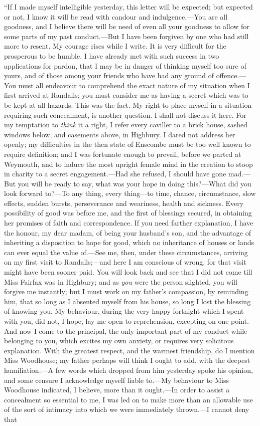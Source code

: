 “If I made myself intelligible yesterday, this letter will be expected; but expected or not, I know it will be read with candour and indulgence.---You are all goodness, and I believe there will be need of even all your goodness to allow for some parts of my past conduct.---But I have been forgiven by one who had still more to resent. My courage rises while I write. It is very difficult for the prosperous to be humble. I have already met with such success in two applications for pardon, that I may be in danger of thinking myself too sure of yours, and of those among your friends who have had any ground of offence.---You must all endeavour to comprehend the exact nature of my situation when I first arrived at Randalls; you must consider me as having a secret which was to be kept at all hazards. This was the fact. My right to place myself in a situation requiring such concealment, is another question. I shall not discuss it here. For my temptation to {\em think} it a right, I refer every caviller to a brick house, sashed windows below, and casements above, in Highbury. I dared not address her openly; my difficulties in the then state of Enscombe must be too well known to require definition; and I was fortunate enough to prevail, before we parted at Weymouth, and to induce the most upright female mind in the creation to stoop in charity to a secret engagement.---Had she refused, I should have gone mad.---But you will be ready to say, what was your hope in doing this?---What did you look forward to?---To any thing, every thing---to time, chance, circumstance, slow effects, sudden bursts, perseverance and weariness, health and sickness. Every possibility of good was before me, and the first of blessings secured, in obtaining her promises of faith and correspondence. If you need farther explanation, I have the honour, my dear madam, of being your husband's son, and the advantage of inheriting a disposition to hope for good, which no inheritance of houses or lands can ever equal the value of.---See me, then, under these circumstances, arriving on my first visit to Randalls;---and here I am conscious of wrong, for that visit might have been sooner paid. You will look back and see that I did not come till Miss Fairfax was in Highbury; and as {\em you} were the person slighted, you will forgive me instantly; but I must work on my father's compassion, by reminding him, that so long as I absented myself from his house, so long I lost the blessing of knowing you. My behaviour, during the very happy fortnight which I spent with you, did not, I hope, lay me open to reprehension, excepting on one point. And now I come to the principal, the only important part of my conduct while belonging to you, which excites my own anxiety, or requires very solicitous explanation. With the greatest respect, and the warmest friendship, do I mention Miss Woodhouse; my father perhaps will think I ought to add, with the deepest humiliation.---A few words which dropped from him yesterday spoke his opinion, and some censure I acknowledge myself liable to.---My behaviour to Miss Woodhouse indicated, I believe, more than it ought.---In order to assist a concealment so essential to me, I was led on to make more than an allowable use of the sort of intimacy into which we were immediately thrown.---I cannot deny that 